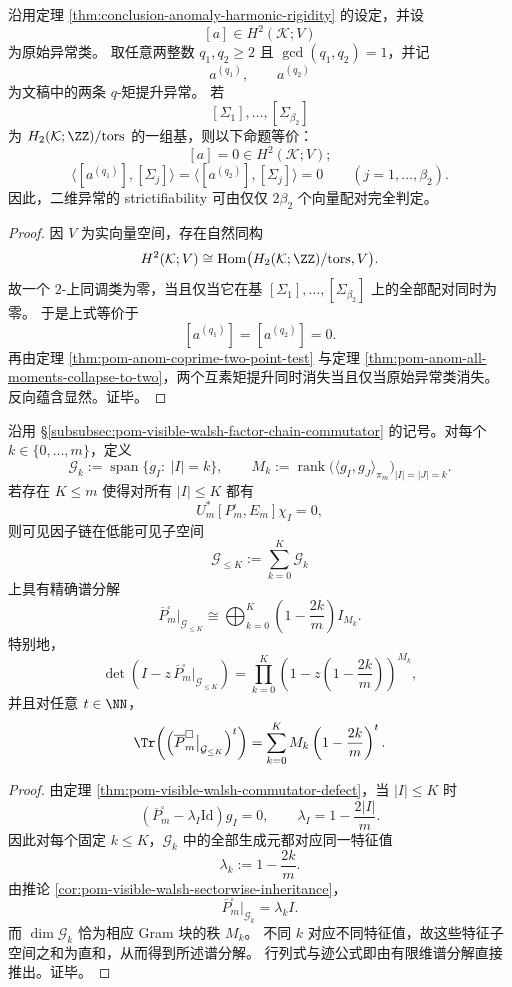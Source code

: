 \begin{corollary}[二维异常的双互素矩层析完备性]\label{cor:conclusion-anomaly-two-coprime-layer-tomography}
沿用定理 \ref{thm:conclusion-anomaly-harmonic-rigidity} 的设定，并设
\[
[a]\in H^2(\mathcal K;V)
\]
为原始异常类。
取任意两整数 \(q_1,q_2\ge 2\) 且 \(\gcd(q_1,q_2)=1\)，并记
\[
a^{(q_1)},\qquad a^{(q_2)}
\]
为文稿中的两条 \(q\)-矩提升异常。
若
\[
[\Sigma_1],\dots,[\Sigma_{\beta_2}]
\]
为 \(H_2(\mathcal K;\ZZ)/\mathrm{tors}\) 的一组基，则以下命题等价：
\[
[a]=0\in H^2(\mathcal K;V);
\]
\[
\langle [a^{(q_1)}],[\Sigma_j]\rangle
=
\langle [a^{(q_2)}],[\Sigma_j]\rangle
=0
\qquad (j=1,\dots,\beta_2).
\]
因此，二维异常的 strictifiability 可由仅仅 \(2\beta_2\) 个向量配对完全判定。
\end{corollary}
\begin{proof}
因 \(V\) 为实向量空间，存在自然同构
\[
H^2(\mathcal K;V)
\cong
\operatorname{Hom}\bigl(H_2(\mathcal K;\ZZ)/\mathrm{tors},V\bigr).
\]
故一个 \(2\)-上同调类为零，当且仅当它在基 \([\Sigma_1],\dots,[\Sigma_{\beta_2}]\) 上的全部配对同时为零。
于是上式等价于
\[
[a^{(q_1)}]=[a^{(q_2)}]=0.
\]
再由定理 \ref{thm:pom-anom-coprime-two-point-test} 与定理 \ref{thm:pom-anom-all-moments-collapse-to-two}，两个互素矩提升同时消失当且仅当原始异常类消失。
反向蕴含显然。证毕。
\end{proof}

\begin{theorem}\label{thm:conclusion-visible-walsh-low-order-barcode}
沿用 \S\ref{subsubsec:pom-visible-walsh-factor-chain-commutator} 的记号。对每个 \(k\in\{0,\dots,m\}\)，定义
\[
\mathcal G_k:=\operatorname{span}\{g_I:\ |I|=k\},
\qquad
M_k:=\operatorname{rank}\bigl(\langle g_I,g_J\rangle_{\pi_m}\bigr)_{|I|=|J|=k}.
\]
若存在 \(K\le m\) 使得对所有 \(|I|\le K\) 都有
\[
U_m^\ast[P_m^\square,E_m]\chi_I=0,
\]
则可见因子链在低能可见子空间
\[
\mathcal G_{\le K}:=\sum_{k=0}^{K}\mathcal G_k
\]
上具有精确谱分解
\[
\overline P_m^\square\big|_{\mathcal G_{\le K}}
\cong
\bigoplus_{k=0}^{K}\left(1-\frac{2k}{m}\right)I_{M_k}.
\]
特别地，
\[
\det\!\left(I-z\,\overline P_m^\square\big|_{\mathcal G_{\le K}}\right)
=
\prod_{k=0}^{K}\left(1-z\left(1-\frac{2k}{m}\right)\right)^{M_k},
\]
并且对任意 \(t\in\NN\)，
\[
\Tr\!\left(\left(\overline P_m^\square\big|_{\mathcal G_{\le K}}\right)^t\right)
=
\sum_{k=0}^{K}M_k\left(1-\frac{2k}{m}\right)^t.
\]
\end{theorem}
\begin{proof}
由定理 \ref{thm:pom-visible-walsh-commutator-defect}，当 \(|I|\le K\) 时
\[
(\overline P_m^\square-\lambda_I\mathrm{Id})g_I=0,
\qquad
\lambda_I=1-\frac{2|I|}{m}.
\]
因此对每个固定 \(k\le K\)，\(\mathcal G_k\) 中的全部生成元都对应同一特征值
\[
\lambda_k:=1-\frac{2k}{m}.
\]
由推论 \ref{cor:pom-visible-walsh-sectorwise-inheritance}，
\[
\overline P_m^\square\big|_{\mathcal G_k}
=
\lambda_k I.
\]
而 \(\dim\mathcal G_k\) 恰为相应 Gram 块的秩 \(M_k\)。
不同 \(k\) 对应不同特征值，故这些特征子空间之和为直和，从而得到所述谱分解。
行列式与迹公式即由有限维谱分解直接推出。证毕。
\end{proof}

